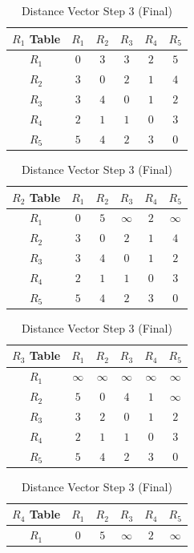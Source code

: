 \documentclass[en]{university}
\begin{document}
\begin{table}[H]
    \centering
    \caption{Distance Vector Step 3 (Final)}
    \label{tab:dvr3}
    \begin{tabular}{c|*5c}
        $R_1$ Table & $R_1$ & $R_2$ & $R_3$ & $R_4$ & $R_5$ \\
        \hline
        $R_1$       & $0$   & $3$   & $3$   & $2$   & $5$   \\
        $R_2$       & $3$   & $0$   & $2$   & $1$   & $4$   \\
        $R_3$       & $3$   & $4$   & $0$   & $1$   & $2$   \\
        $R_4$       & $2$   & $1$   & $1$   & $0$   & $3$   \\
        $R_5$       & $5$   & $4$   & $2$   & $3$   & $0$
    \end{tabular}
    \begin{tabular}{c|*5c}
        $R_2$ Table & $R_1$ & $R_2$ & $R_3$    & $R_4$ & $R_5$    \\
        \hline
        $R_1$       & $0$   & $5$   & $\infty$ & $2$   & $\infty$ \\
        $R_2$       & $3$   & $0$   & $2$      & $1$   & $4$      \\
        $R_3$       & $3$   & $4$   & $0$      & $1$   & $2$      \\
        $R_4$       & $2$   & $1$   & $1$      & $0$   & $3$      \\
        $R_5$       & $5$   & $4$   & $2$      & $3$   & $0$
    \end{tabular}
    \begin{tabular}{c|*5c}
        $R_3$ Table & $R_1$    & $R_2$    & $R_3$    & $R_4$    & $R_5$    \\
        \hline
        $R_1$       & $\infty$ & $\infty$ & $\infty$ & $\infty$ & $\infty$ \\
        $R_2$       & $5$      & $0$      & $4$      & $1$      & $\infty$ \\
        $R_3$       & $3$      & $2$      & $0$      & $1$      & $2$      \\
        $R_4$       & $2$      & $1$      & $1$      & $0$      & $3$      \\
        $R_5$       & $5$      & $4$      & $2$      & $3$      & $0$
    \end{tabular}
    \begin{tabular}{c|*5c}
        $R_4$ Table & $R_1$ & $R_2$ & $R_3$    & $R_4$ & $R_5$    \\
        \hline
        $R_1$       & $0$   & $5$   & $\infty$ & $2$   & $\infty$ \\

\end{tabular}
\end{table}
\end{document}
